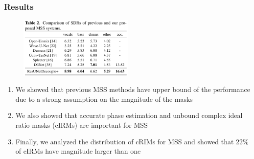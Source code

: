 \documentclass[usenames,dvipsnames]{beamer}
\begin{document}
\begin{frame}
	\frametitle{Results}
	\begin{figure}
	\centering
	\includegraphics[height=3cm]{./images-misc/ismir2021-phasepaper.png}
	\end{figure}

	\begin{enumerate}
		\item
			We showed that previous MSS methods have upper bound of the performance due to a strong assumption on the magnitude of the masks
		\item
			We also showed that accurate phase estimation and unbound complex ideal ratio masks (cIRMs) are important for MSS
		\item
			Finally, we analyzed the distribution of cRIMs for MSS and showed that 22\% of cIRMs have magnitude larger than one
	\end{enumerate}
\end{frame}
\end{document}
